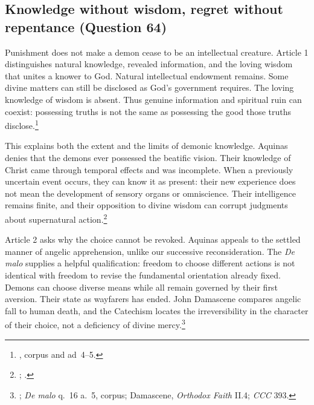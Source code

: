 
\subsection{Knowledge without wisdom, regret without repentance (Question 64)}

Punishment does not make a demon cease to be an intellectual creature. Article 1 distinguishes natural knowledge, revealed information, and the loving wisdom that unites a knower to God. Natural intellectual endowment remains. Some divine matters can still be disclosed as God's government requires. The loving knowledge of wisdom is absent. Thus genuine information and spiritual ruin can coexist: possessing truths is not the same as possessing the good those truths disclose.\footnote{, corpus and ad~4--5.}

This explains both the extent and the limits of demonic knowledge. Aquinas denies that the demons ever possessed the beatific vision. Their knowledge of Christ came through temporal effects and was incomplete. When a previously uncertain event occurs, they can know it as present: their new experience does not mean the development of sensory organs or omniscience. Their intelligence remains finite, and their opposition to divine wisdom can corrupt judgments about supernatural action.\footnote{; .}

Article 2 asks why the choice cannot be revoked. Aquinas appeals to the settled manner of angelic apprehension, unlike our successive reconsideration. The \emph{De malo} supplies a helpful qualification: freedom to choose different actions is not identical with freedom to revise the fundamental orientation already fixed. Demons can choose diverse means while all remain governed by their first aversion. Their state as wayfarers has ended. John Damascene compares angelic fall to human death, and the Catechism locates the irreversibility in the character of their choice, not a deficiency of divine mercy.\footnote{; \emph{De malo} q.~16 a.~5, corpus; Damascene, \emph{Orthodox Faith} II.4; \emph{CCC} 393.}

